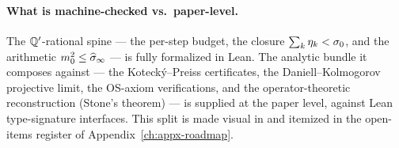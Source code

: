 \paragraph*{What is machine-checked vs.\ paper-level.}  The
$\mathbb{Q}'$-rational spine --- the per-step budget, the closure
$\sum_k \eta_k < \sigma_0$, and the arithmetic
$m_0^2 \le \widehat{\sigma}_\infty$ --- is fully formalized in Lean.  The
analytic bundle it composes against --- the Kotecký--Preiss
certificates, the Daniell--Kolmogorov projective limit, the OS-axiom
verifications, and the operator-theoretic reconstruction (Stone's
theorem) --- is supplied at the paper level, against Lean
type-signature interfaces.  This split is made visual in
 and itemized in the open-items register
of Appendix~\ref{ch:appx-roadmap}.
